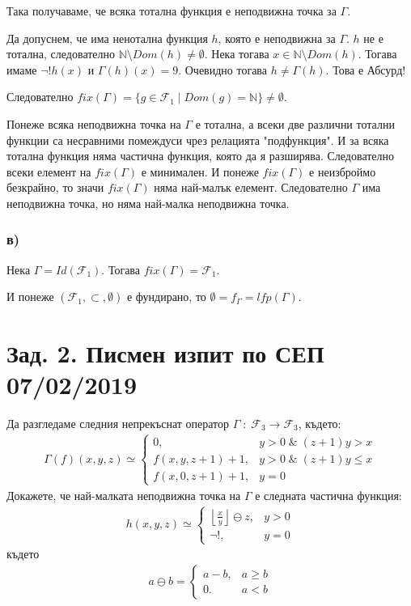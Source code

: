 \documentclass{article}
\begin{document}
Така получаваме, че всяка тотална функция е неподвижна точка за \(\Gamma\).

Да допуснем, че има ненотална функция \(h\), която е неподвижна за \(\Gamma\).
\(h\) не е тотална, следователно \(\mathbb{N} \setminus Dom(h) \neq \emptyset\).
Нека тогава \(x \in \mathbb{N} \setminus Dom(h)\).
Тогава имаме \(\lnot!h(x)\) и \(\Gamma(h)(x) = 9\).
Очевидно тогава \(h \neq \Gamma(h)\). Това е Абсурд!

Следователно \(fix(\Gamma) = \{g \in \mathcal{F}_1 \; | \; Dom(g) = \mathbb{N}\} \neq \emptyset\).

Понеже всяка неподвижна точка на \(\Gamma\) е тотална,
а всеки две различни тотални функции са несравними помеждуси чрез релацията "подфункция".
И за всяка тотална функция няма частична функция, която да я разширява.
Следователно всеки елемент на \(fix(\Gamma)\) е минимален.
И понеже \(fix(\Gamma)\) е неизброймо безкрайно,
то значи \(fix(\Gamma)\) няма най-малък елемент.
Следователно \(\Gamma\) има неподвижна точка,
но няма най-малка неподвижна точка.

\subsubsection*{в)}
Нека \(\Gamma = Id(\mathcal{F}_1)\).
Тогава \(fix(\Gamma) = \mathcal{F}_1\).

И понеже \((\mathcal{F}_1, \subset, \emptyset)\) е фундирано,
то \(\emptyset = f_\Gamma = lfp(\Gamma)\). 

\section*{Зад. 2. Писмен изпит по СЕП 07/02/2019}
Да разгледаме следния непрекъснат оператор \(\Gamma \; : \; \mathcal{F}_3 \to \mathcal{F}_3\), където:
\begin{align*}
\Gamma(f)(x, y, z) \simeq \begin{cases}
0, & y > 0 \; \& \; (z + 1)y > x \\
f(x, y, z + 1) + 1, & y > 0 \; \& \; (z + 1)y \leq x \\
f(x, 0, z + 1) + 1, & y = 0
\end{cases}
\end{align*}
Докажете, че най-малката неподвижна точка на \(\Gamma\) е следната частична функция:
\begin{align*}
h(x, y, z) \simeq \begin{cases}
\displaystyle\left\lfloor\frac{x}{y}\right\rfloor \ominus z, & y > 0\\
\lnot!, & y = 0
\end{cases}
\end{align*}
където
\begin{align*}
a \ominus b = \begin{cases}
a - b, & a \geq b \\
0. & a < b
\end{cases}
\end{align*}
\end{document}
